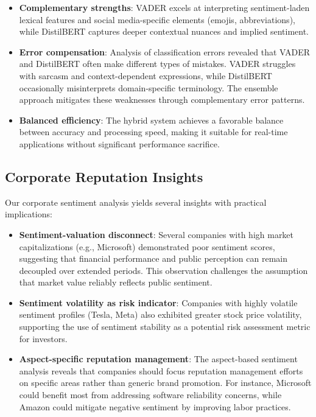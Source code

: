 \documentclass[conference]{IEEEtran}
\begin{document}
\begin{itemize}
    \item \textbf{Complementary strengths}: VADER excels at interpreting sentiment-laden lexical features and social media-specific elements (emojis, abbreviations), while DistilBERT captures deeper contextual nuances and implied sentiment.
    
    \item \textbf{Error compensation}: Analysis of classification errors revealed that VADER and DistilBERT often make different types of mistakes. VADER struggles with sarcasm and context-dependent expressions, while DistilBERT occasionally misinterprets domain-specific terminology. The ensemble approach mitigates these weaknesses through complementary error patterns.
    
    \item \textbf{Balanced efficiency}: The hybrid system achieves a favorable balance between accuracy and processing speed, making it suitable for real-time applications without significant performance sacrifice.
\end{itemize}

\subsection{Corporate Reputation Insights}

Our corporate sentiment analysis yields several insights with practical implications:

\begin{itemize}
    \item \textbf{Sentiment-valuation disconnect}: Several companies with high market capitalizations (e.g., Microsoft) demonstrated poor sentiment scores, suggesting that financial performance and public perception can remain decoupled over extended periods. This observation challenges the assumption that market value reliably reflects public sentiment.
    
    \item \textbf{Sentiment volatility as risk indicator}: Companies with highly volatile sentiment profiles (Tesla, Meta) also exhibited greater stock price volatility, supporting the use of sentiment stability as a potential risk assessment metric for investors.
    
    \item \textbf{Aspect-specific reputation management}: The aspect-based sentiment analysis reveals that companies should focus reputation management efforts on specific areas rather than generic brand promotion. For instance, Microsoft could benefit most from addressing software reliability concerns, while Amazon could mitigate negative sentiment by improving labor practices.
\end{itemize}
\end{document}
